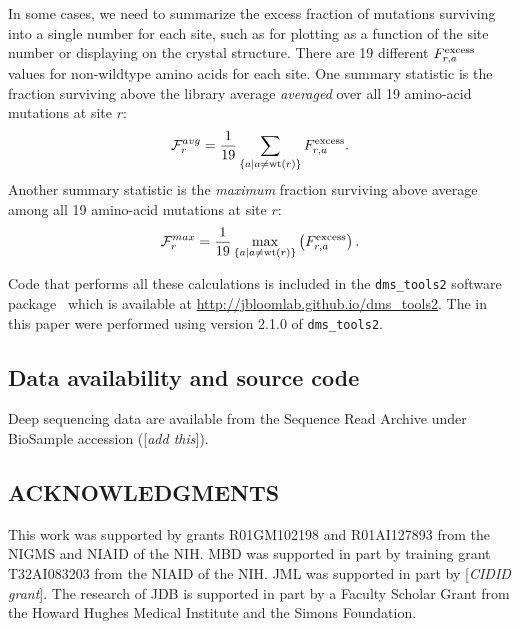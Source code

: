\documentclass[11pt]{article}
\newcommand{\comment}[1]{{\color{red}[\textsl{#1}]}}
\begin{document}
In some cases, we need to summarize the excess fraction of mutations surviving into a single number for each site, such as for plotting as a function of the site number or displaying on the crystal structure.
There are 19 different $F_{r,a}^{\rm{excess}}$ values for non-wildtype amino acids for each site. 
One summary statistic is the fraction surviving above the library average \emph{averaged} over all 19 amino-acid mutations at site $r$:
\begin{equation}
\label{eq:avgfracsurvive}
\mathcal{F}_r^{avg} = \frac{1}{19} \sum\limits_{\left\{a \mid a \ne \operatorname{wt}\left(r\right)\right\}} F_{r,a}^{\rm{excess}}.
\end{equation}
Another summary statistic is the \emph{maximum} fraction surviving above average among all 19 amino-acid mutations at site $r$:
\begin{equation}
\label{eq:maxfracsurvive}
\mathcal{F}_r^{max} = \frac{1}{19} \max\limits_{\left\{a \mid a \ne \operatorname{wt}\left(r\right)\right\}}\left( F_{r,a}^{\rm{excess}} \right).
\end{equation}

Code that performs all these calculations is included in the \texttt{dms\_tools2} software package~\citep{bloom2015software} which is available at \url{http://jbloomlab.github.io/dms_tools2}.
The in this paper were performed using version 2.1.0 of \texttt{dms\_tools2}.

\subsection*{Data availability and source code}
Deep sequencing data are available from the Sequence Read Archive under BioSample accession (\comment{add this}).

\subsection*{ACKNOWLEDGMENTS}
This work was supported by grants R01GM102198 and R01AI127893 from the NIGMS and NIAID of the NIH.
MBD was supported in part by training grant T32AI083203 from the NIAID of the NIH.
JML was supported in part by \comment{CIDID grant}.
The research of JDB is supported in part by a Faculty Scholar Grant from the Howard Hughes Medical Institute and the Simons Foundation.




\clearpage
\normalsize
\end{document}

